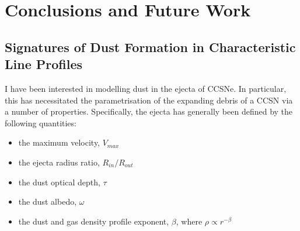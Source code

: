 \chapter{Conclusions and Future Work}\label{chp:chp7}

%
%



\section{Signatures of Dust Formation in Characteristic Line Profiles}

I have been interested in modelling dust in the ejecta of CCSNe.  In particular, this has necessitated the parametrisation of the expanding debris of a CCSN via a number of properties.  Specifically, the ejecta has generally been defined by the following quantities:

\begin{itemize}
\item the maximum velocity, $V_{max}$
\item the ejecta radius ratio, $R_{in}/R_{out}$
\item the dust optical depth,  $\tau$
\item the dust albedo, $\omega$ 
\item the dust and gas density profile exponent, $\beta$, where $\rho \propto r^{-\beta}$
\end{itemize}

